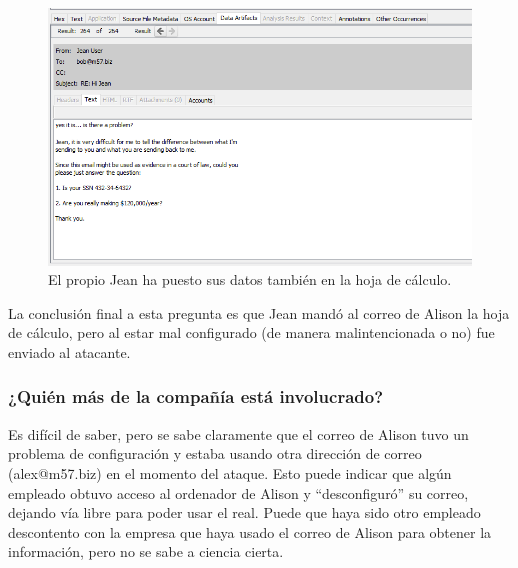 \documentclass{article}
\begin{document}
\begin{figure}[H]
    \centering
    \includegraphics[width=\textwidth]{imagenes/Windows/Captura de pantalla (16).png}
    \caption{El propio Jean ha puesto sus datos también en la hoja de cálculo.}
\end{figure}

La conclusión final a esta pregunta es que Jean mandó al correo de Alison la hoja de cálculo, pero al estar mal configurado (de manera malintencionada o no) fue enviado al atacante.


\subsubsection*{¿Quién más de la compañía está involucrado?}

Es difícil de saber, pero se sabe claramente que el correo de Alison tuvo un problema de configuración y estaba usando otra dirección de correo (alex@m57.biz) en el momento del ataque. Esto puede indicar que algún empleado obtuvo acceso al ordenador de Alison y ``desconfiguró'' su correo, dejando vía libre para poder usar el real. Puede que haya sido otro empleado descontento con la empresa que haya usado el correo de Alison para obtener la información, pero no se sabe a ciencia cierta.
\end{document}
